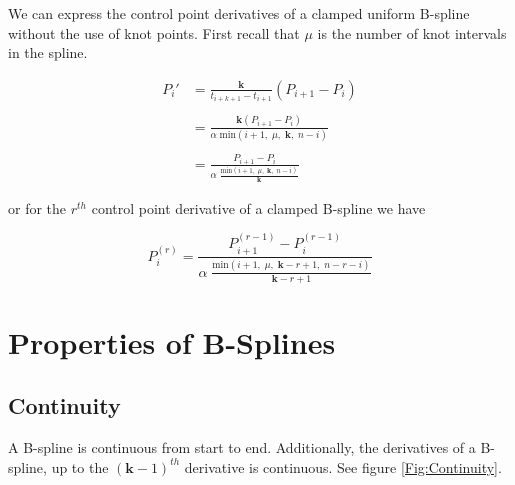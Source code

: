 \documentclass{article}
\begin{document}
We can express the control point derivatives of a clamped uniform B-spline without the use of knot points. First recall that \(\mu\) is the number of knot intervals in the spline.

\begin{equation}
\begin{aligned}
    P_i' &= \frac{\textbf{k}}{t_{i+k+1}-t_{i+1}}(P_{i+1} - P_{i}) \\\\
    &= \frac{\textbf{k} (P_{i+1} - P_i)}{\alpha \; \text{min}(i+1,\;\mu,\;\textbf{k},\; n-i)} \\\\
    &= \frac{ P_{i+1} - P_i}{\alpha \; \frac{\text{min}(i+1,\;\mu,\;\textbf{k},\; n-i)}{\textbf{k}}}
\end{aligned}
\end{equation}

or for the \(r^{th}\) control point derivative of a clamped B-spline we have

\begin{equation} \label{rth clamped control point derivative}
    P_i^{(r)} = \frac{ P_{i+1}^{(r-1)} - P_i^{(r-1)}}{\alpha \; \frac{\text{min}(i+1,\;\mu,\;\textbf{k}-r+1,\; n-r-i)}{\textbf{k}-r+1}}
\end{equation}

\section{Properties of B-Splines}
    \subsection{Continuity}
    A B-spline is continuous from start to end. Additionally, the derivatives of a B-spline, up to the \((\textbf{k}-1)^{th}\) derivative is continuous. See figure \ref{Fig:Continuity}.
    
\end{document}
